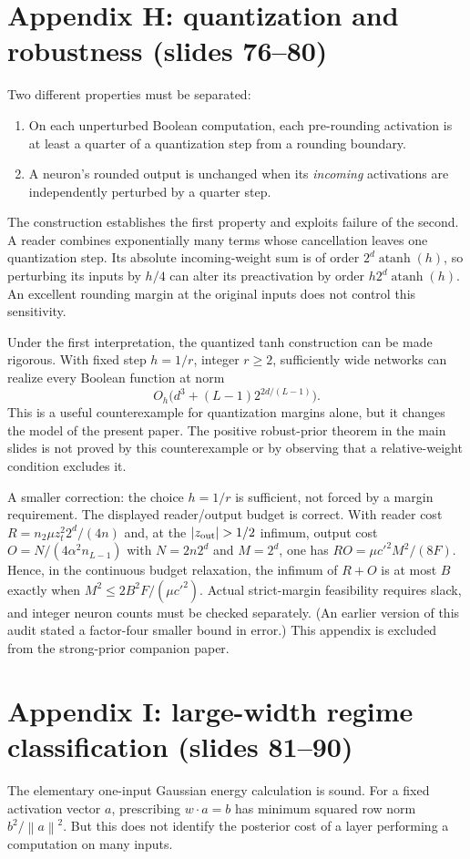\documentclass[11pt]{article}
\newcommand{\norm}[1]{\left\lVert#1\right\rVert}
\begin{document}
\section{Appendix H: quantization and robustness (slides 76--80)}
Two different properties must be separated:
\begin{enumerate}
\item On each unperturbed Boolean computation, each pre-rounding activation is at least a quarter of a quantization step from a rounding boundary.
\item A neuron's rounded output is unchanged when its \emph{incoming} activations are independently perturbed by a quarter step.
\end{enumerate}
The construction establishes the first property and exploits failure of the second. A reader combines exponentially many terms whose cancellation leaves one quantization step. Its absolute incoming-weight sum is of order $2^d\operatorname{atanh}(h)$, so perturbing its inputs by $h/4$ can alter its preactivation by order $h2^d\operatorname{atanh}(h)$. An excellent rounding margin at the original inputs does not control this sensitivity.

Under the first interpretation, the quantized tanh construction can be made rigorous. With fixed step $h=1/r$, integer $r\geq2$, sufficiently wide networks can realize every Boolean function at norm
\[
 O_h\bigl(d^3+(L-1)2^{2d/(L-1)}\bigr).
\]
This is a useful counterexample for quantization margins alone, but it changes the model of the present paper. The positive robust-prior theorem in the main slides is not proved by this counterexample or by observing that a relative-weight condition excludes it.

A smaller correction: the choice $h=1/r$ is sufficient, not forced by a margin requirement. The displayed reader/output budget is correct. With reader cost $R=n_2\mu z_t^2 2^d/(4n)$ and, at the $|z_{\rm out}|>1/2$ infimum, output cost $O=N/(4\alpha^2 n_{L-1})$ with $N=2n2^d$ and $M=2^d$, one has $RO=\mu c'^2M^2/(8F)$. Hence, in the continuous budget relaxation, the infimum of $R+O$ is at most $B$ exactly when $M^2\leq 2B^2F/(\mu c'^2)$. Actual strict-margin feasibility requires slack, and integer neuron counts must be checked separately. (An earlier version of this audit stated a factor-four smaller bound in error.) This appendix is excluded from the strong-prior companion paper.

\section{Appendix I: large-width regime classification (slides 81--90)}
The elementary one-input Gaussian energy calculation is sound. For a fixed activation vector $a$, prescribing $w\cdot a=b$ has minimum squared row norm $b^2/\norm a^2$. But this does not identify the posterior cost of a layer performing a computation on many inputs.
\end{document}
